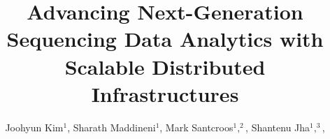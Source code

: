 \documentclass{cpeauth}
\begin{document}


\def\cop{Copyright \copyright\ 2000 John Wiley \&\ Sons, Ltd.}



\newif\ifdraft
\drafttrue                                                                                                   

\ifdraft
 \newcommand{\jkimnote}[1]{{\textcolor{green}   { ***Joohyun:   #1 }}}
 \newcommand{\jhanote}[1]{  {\textcolor{red}     { ***SJ: #1 }}}
  \newcommand{\smnote}[1]{  {\textcolor{red}     { ***Sharath: #1 }}}
  \newcommand{\msnote}[1]{  {\textcolor{blue}     { ***Mark: #1 }}}

 \newcommand{\todo}[1]{  {\textcolor{red}     { ***TODO: #1 }}}
 \newcommand{\fix}[1]{  {\textcolor{red}     { ***FIX: #1 }}}
 \newcommand{\reviewer}[1]{}
\else
 \newcommand{\reviewer}[1]{}
 \newcommand{\jkimnote}[1]{}
 \newcommand{\smnote}[1]{}
 \newcommand{\jhanote}[1]{}
 \newcommand{\todo}[1]{  {\textcolor{red}     { ***TODO: #1 }}}
 \newcommand{\fix}[1]{}                                                                                     
\fi


\title{Advancing Next-Generation Sequencing Data Analytics with Scalable Distributed Infrastructures}


\author{
Joohyun Kim\ensuremath{^1}\comma\footnotemark[2], 
Sharath Maddineni\ensuremath{^1},
Mark Santcroos\ensuremath{^1,^2},
Shantenu Jha\corrauth\ensuremath{^1,^3}\comma\footnotemark[3],
}


\date{}

\received{}
\revised{}
\noaccepted{}
\end{document}
